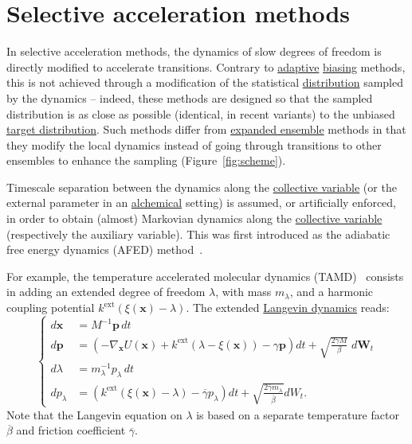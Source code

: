 \documentclass[9pt,review]{livecoms}
\newcommand{\vx}{\mathbf{x}}
\newcommand{\vp}{\mathbf{p}}
\begin{document}
\section{Selective acceleration methods}
\label{sec:selective_accel}


In selective acceleration methods, the dynamics of slow degrees of freedom is directly modified to accelerate transitions.
Contrary to \hyperlink{ref:Adaptive} {adaptive} \hyperlink{ref:biasingE} {biasing} methods, this is not achieved through a modification of the statistical \hyperlink{ref:Distribution} {distribution} sampled by the dynamics -- indeed, these methods are designed so that the sampled distribution is as close as possible (identical, in recent variants) to the unbiased \hyperlink{ref:targetdist} {target distribution}.
Such methods differ from \hyperlink{ref:ExpEns} {expanded ensemble} methods in that they modify the local dynamics instead of going through transitions to other ensembles to enhance the sampling (Figure~\ref{fig:scheme}).

Timescale separation between the dynamics along the \hyperlink{ref:CV} {collective variable} (or the external parameter in an \hyperlink{ref:Alchemical} {alchemical} setting) is assumed, or artificially enforced, in order to obtain (almost) Markovian dynamics along the \hyperlink{ref:CV} {collective variable} (respectively the auxiliary variable).
This was first introduced as the adiabatic free energy dynamics (AFED) method~\cite{doi:10.1063/1.1448491}.

For example, the temperature accelerated molecular dynamics (TAMD)~\cite{MV06} consists in adding an extended degree of freedom $\lambda$, with mass $m_\lambda$, and a harmonic coupling potential $k^\mathrm{ext} \left( \xi(\vx) - \lambda \right)$.
The extended \hyperlink{ref:Langevin} {Langevin dynamics} reads:
\begin{equation}
\left\{
\begin{array}{ll}
    d\vx &= M^{-1} \vp \,  dt \\
    d\vp &= \left(-\nabla_\vx U(\vx) + k^\mathrm{ext} ( \lambda -\xi(\vx)) - \gamma \vp \right) dt
    + \sqrt{ \frac{2 \gamma M}{\beta}} \; d\mathbf{W}_t \\
    d\lambda &= m_\lambda^{-1} p_\lambda \, dt\\
    d p_\lambda &= \left( k^\mathrm{ext} (\xi(\vx) - \lambda)  - \overline\gamma p_\lambda \right) dt
    + \sqrt{ \frac{2 \bar\gamma m_\lambda}{ \overline\beta}} dW_t.
\end{array}
\right.
\end{equation}
Note that the Langevin equation on $\lambda$ is based on a separate temperature factor $\overline \beta$ and friction coefficient $\overline{\gamma}$.
\end{document}
